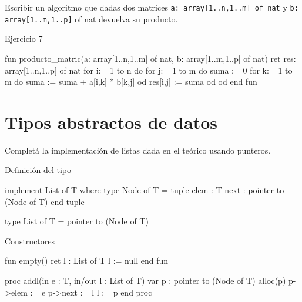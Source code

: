 Escribir un algoritmo que dadas dos matrices \texttt{a: array[1..n,1..m] of nat} y \texttt{b: array[1..m,1..p]} of nat devuelva su producto.

\begin{codebox}{Ejercicio 7}
\begin{pascallike}
fun producto_matric(a: array[1..n,1..m] of nat, b: array[1..m,1..p] of nat) 
ret res: array[1..n,1..p] of nat
    for i:= 1 to n do
        for j:= 1 to m do
            suma := 0
            for k:= 1 to m do 
                suma := suma + a[i,k] * b[k,j]
            od
            res[i,j] := suma
        od
    od
end fun
\end{pascallike}
\end{codebox}

\section{Tipos abstractos de datos}

Completá la implementación de listas dada en el teórico usando punteros.

\begin{codebox}{Definición del tipo}
\begin{pascallike}
implement List of T where
type Node of T = tuple
                   elem : T
                   next : pointer to (Node of T)
                 end tuple

type List of T = pointer to (Node of T)

\end{pascallike}
\end{codebox}

\begin{codebox}{Constructores}
\begin{pascallike}
fun empty() ret l : List of T
    l := null
end fun

proc addl(in e : T, in/out l : List of T)
    var p : pointer to (Node of T)
    alloc(p)
    p->elem := e
    p->next := l
    l := p
end proc
\end{pascallike}
\end{codebox}

